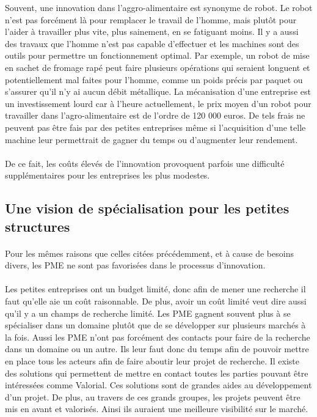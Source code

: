 \documentclass[a4paper,12pt]{report}
\begin{document}
		Souvent, une innovation dans l'aggro-alimentaire est synonyme de robot. Le robot n'est pas forcément là pour remplacer le travail de l'homme, mais plutôt pour l'aider à travailler plus vite, plus sainement, en se fatiguant moins. Il y a aussi des travaux que l'homme n'est pas capable d'effectuer et les machines sont des outils pour permettre un fonctionnement optimal. Par exemple, un robot de mise en sachet de fromage rapé peut faire plusieurs opérations qui seraient longuent et potentiellement mal faites pour l'homme, comme un poids précis par paquet ou s'assurer qu'il n'y ai aucun débit métallique. La mécanisation d'une entreprise est un investissement lourd car à l'heure actuellement, le prix moyen d'un robot pour travailler dans l'agro-alimentaire est de l'ordre de 120 000 euros\cite{LesRobots}. De tels frais ne peuvent pas être fais par des petites entreprises même si l'acquisition d'une telle machine leur permettrait de gagner du temps ou d'augmenter leur rendement.
		
		\paragraph{}De ce fait, les coûts élevés de l'innovation provoquent parfois une difficulté supplémentaires pour les entreprises les plus modestes.
				
		\subsection{Une vision de spécialisation pour les petites structures}
		\paragraph{}Pour les mêmes raisons que celles citées précédemment, et à cause de besoins divers, les PME ne sont pas favorisées dans le processus d'innovation.
		
		\paragraph{}Les petites entreprises ont un budget limité, donc afin de mener une recherche il faut qu’elle aie un coût raisonnable. De plus, avoir un coût limité veut dire aussi qu’il y a un champs de recherche limité. Les PME gagnent souvent plus à se spécialiser dans un domaine plutôt que de se développer sur plusieurs marchés à la fois. Aussi les PME n’ont pas forcément des contacts pour faire de la recherche dans un domaine ou un autre. Ils leur faut donc du temps afin de pouvoir mettre en place tous les acteurs afin de faire aboutir leur projet de recherche. Il existe des solutions qui permettent de mettre en contact toutes les parties pouvant être intéressées comme Valorial. Ces solutions sont de grandes aides au développement d’un projet. De plus, au travers de ces grands groupes, les projets peuvent être mis en avant et valorisés. Ainsi ils auraient une meilleure visibilité sur le marché. 
		
\end{document}
